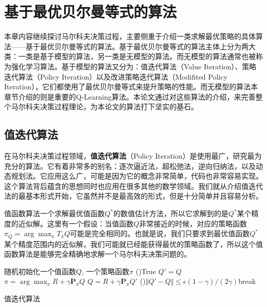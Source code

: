 \section{基于最优贝尔曼等式的算法}

本章内容继续探讨马尔科夫决策过程，主要侧重于介绍一类求解最优策略的具体算法——基于最优贝尔曼等式的算法。基于最优贝尔曼等式的算法主体上分为两大类：一类是基于模型的算法，另一类是无模型的算法。而无模型的算法通常也被称为强化学习算法。基于模型的算法又分为：值迭代算法（Value Iteration）、策略迭代算法（Policy Iteration）以及改进策略迭代算法（Modifited Policy Iteration）\cite{puterman2014markov}，它们都使用了最优贝尔曼等式来提升策略的性能。而无模型的算法本章节介绍的则是重要的Q-Learning算法\cite{watkins1989learning,mnih2013playing,mnih2015human}。本论文通过对这些算法的介绍，来完善整个马尔科夫决策过程理论，为本论文的算法打下坚实的基石。

\subsection{值迭代算法}

在马尔科夫决策过程领域，\textbf{值迭代算法}（Policy Iteration）是使用最广，研究最为充分的算法。它有着非常多的别名：逐次逼近法，超松弛法，逆向归纳法，以及动态规划法\cite{feinberg2012handbook}。它应用这么广，可能是因为它的概念非常简单，代码也非常容易实现。这个算法背后蕴含的思想同时也应用在很多其他的数学领域\cite{boyd2004convex}。我们就从介绍值迭代法的最基本形式开始，它虽然并不是最高效的形式，但是十分简单并且容易分析。

值函数算法一个求解最优值函数$Q^*$的数值估计方法，所以它求解到的是$Q^*$某个精度的近似解。这里有一个假设：当值函数$Q$非常接近的时候，对应的策略函数$\pi_Q = \arg\max_{\pi} T_{\pi}Q$可能是完全相同的。也就是说，我们只要求到最优值函数$Q^*$某个精度范围内的近似解，我们可能就已经能获得最优的策略函数了，所以这个值函数算法是能够完全精确地求解一个马尔科夫决策问题的。

\begin{algorithm}[htbp]
    \LinesNumbered
    随机初始化一个值函数$Q$, 一个策略函数$\pi$\;
    \While(){True}{
        $Q' = Q$\;
        $\pi = \arg\max_{\pi} R + \gamma\mathbf{P}_{\pi} Q$\;
        $Q = R + \gamma \mathbf{P}_{\pi} Q'$\;
        \If(){$\Vert Q' - Q \Vert \le \epsilon(1 - \gamma)/(2\gamma)$}{break\;}
    }
    \caption{值迭代算法}
\end{algorithm}


